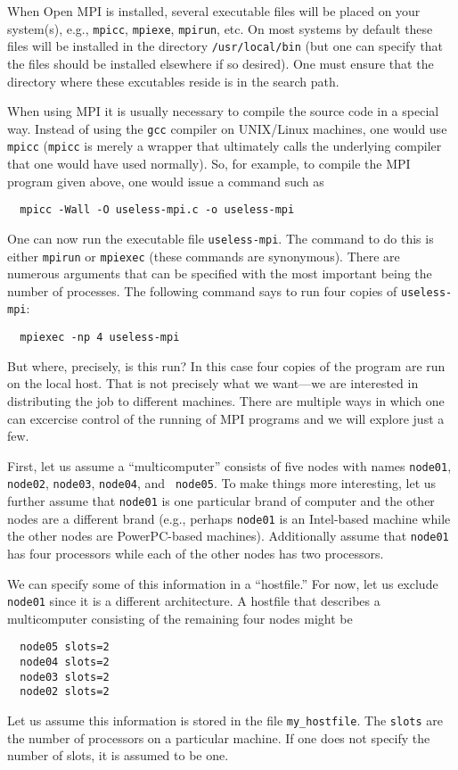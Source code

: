 When Open MPI is installed, several executable files will be placed on
your system(s), e.g., {\tt mpicc}, {\tt mpiexe}, {\tt mpirun}, etc.
On most systems by default these files will be installed in the
directory {\tt /usr/local/bin} (but one can specify that the files
should be installed elsewhere if so desired).  One must ensure that
the directory where these excutables reside is in the search path.

When using MPI it is usually necessary to compile the source code in a
special way.  Instead of using the {\tt gcc} compiler on UNIX/Linux
machines, one would use {\tt mpicc} ({\tt mpicc} is merely a wrapper
that ultimately calls the underlying compiler that one would have used
normally).  So, for example, to compile the MPI program given above,
one would issue a command such as
\begin{verbatim}
  mpicc -Wall -O useless-mpi.c -o useless-mpi
\end{verbatim}

One can now run the executable file {\tt useless-mpi}.  The command to
do this is either {\tt mpirun} or {\tt mpiexec} (these commands are
synonymous).  There are numerous
arguments that can be specified with the most important being the
number of processes.  The following command says to run four copies of
{\tt useless-mpi}:
\begin{verbatim}
  mpiexec -np 4 useless-mpi
\end{verbatim}
But where, precisely, is this run?  In this case four copies of the
program are run on the local host.  That is not precisely what we
want---we are interested in distributing the job to different
machines.  There are multiple ways in which one can excercise control
of the running of MPI programs and we will explore just a few.

First, let us assume a ``multicomputer'' consists of five nodes with
names {\tt node01}, {\tt node02}, {\tt node03}, {\tt node04}, and {\tt
  node05}.  To make things more interesting, let us further assume
that {\tt node01} is one particular brand of computer and the other
nodes are a different brand (e.g., perhaps {\tt node01} is an
Intel-based machine while the other nodes are PowerPC-based machines).
Additionally assume that {\tt node01} has four processors while each
of the other nodes has two processors.

We can specify some of this information in a ``hostfile.''  For now, let us
exclude {\tt node01} since it is a different architecture.  A hostfile
that describes a multicomputer consisting of the remaining four nodes might be
\begin{verbatim}
  node05 slots=2
  node04 slots=2
  node03 slots=2
  node02 slots=2
\end{verbatim}
Let us assume this information is stored in the file {\tt my\_hostfile}.
The {\tt slots} are the number of processors on a particular machine.
If one does not specify the number of slots, it is assumed to be one.  

